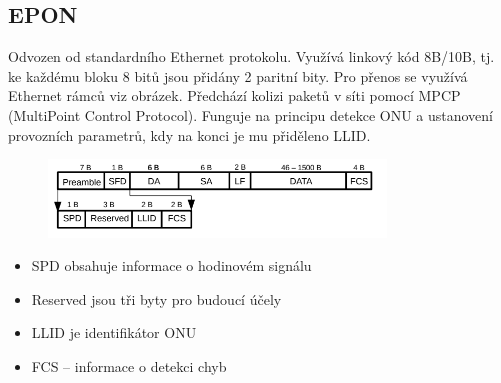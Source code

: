 \subsection{EPON}
Odvozen od standardního Ethernet protokolu. Využívá linkový kód 8B/10B, tj. ke každému bloku 8 bitů jsou přidány 2 paritní bity. Pro přenos se využívá Ethernet rámců viz obrázek. Předchází kolizi paketů v síti pomocí MPCP (MultiPoint Control Protocol). Funguje na principu detekce ONU a ustanovení provozních parametrů, kdy na konci je mu přiděleno LLID.

\begin{figure} [h]
    \centering
    \includegraphics[width=0.8\textwidth]{snimky/EPONframe.png}
\end{figure}

\begin{itemize}
    \item SPD obsahuje informace o hodinovém signálu
    \item Reserved jsou tři byty pro budoucí účely
    \item LLID je identifikátor ONU
    \item FCS -- informace o detekci chyb
\end{itemize}

\clearpage


